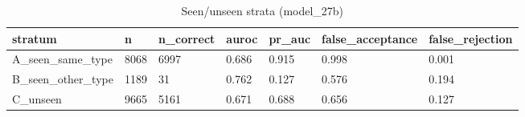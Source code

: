 \begin{table}[t]
\centering
\small
\begin{tabular}{lllllll}
\hline
stratum & n & n\_correct & auroc & pr\_auc & false\_acceptance & false\_rejection \\
\hline
A\_seen\_same\_type & 8068 & 6997 & 0.686 & 0.915 & 0.998 & 0.001 \\
B\_seen\_other\_type & 1189 & 31 & 0.762 & 0.127 & 0.576 & 0.194 \\
C\_unseen & 9665 & 5161 & 0.671 & 0.688 & 0.656 & 0.127 \\
\hline
\end{tabular}
\caption{Seen/unseen strata (model\_27b)}
\label{tab:strata_model_27b}
\end{table}
